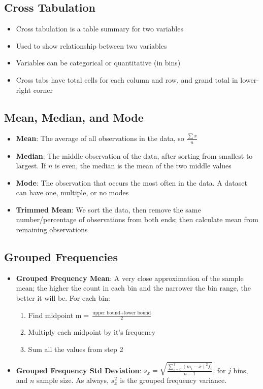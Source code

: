 \documentclass{article}
\begin{document}
\subsection{Cross Tabulation}

\begin{itemize}
    \item Cross tabulation is a table summary for two variables
    \item Used to show relationship between two variables
    \item Variables can be categorical or quantitative (in bins)
    \item Cross tabs have total cells for each column and row, and grand total in lower-right corner
\end{itemize}

\subsection{Mean, Median, and Mode}

\begin{itemize}
    \item \textbf{Mean}: The average of all observations in the data, so $\frac{\sum{x}}{n}$
    \item \textbf{Median}: The middle observation of the data, after sorting from smallest to largest. If $n$ is even, the median is the mean of the two middle values
    \item \textbf{Mode}: The observation that occurs the most often in the data. A dataset can have one, multiple, or no modes
    \item \textbf{Trimmed Mean}: We sort the data, then remove the same number/percentage of observations from both ends; then calculate mean from remaining observations
\end{itemize}

\subsection{Grouped Frequencies}

\begin{itemize}
    \item \textbf{Grouped Frequency Mean}: A very close approximation of the sample mean; the higher the count in each bin and the narrower the bin range, the better it will be. For each bin:
    \begin{enumerate}
        \item Find midpoint $\text{m} = \frac{\text{upper bound} + \text{lower bound}}{2}$ 
        \item Multiply each midpoint by it's frequency
        \item Sum all the values from step 2
    \end{enumerate}
    \item \textbf{Grouped Frequency Std Deviation}: $s_x = \sqrt{\frac{\sum_{i=0}^j{(m_i-\bar{x})^2f_i}}{n-1}}$, for $j$ bins, and $n$ sample size. As always, $s_x^2$ is the grouped frequency variance.
\end{itemize}
\end{document}
